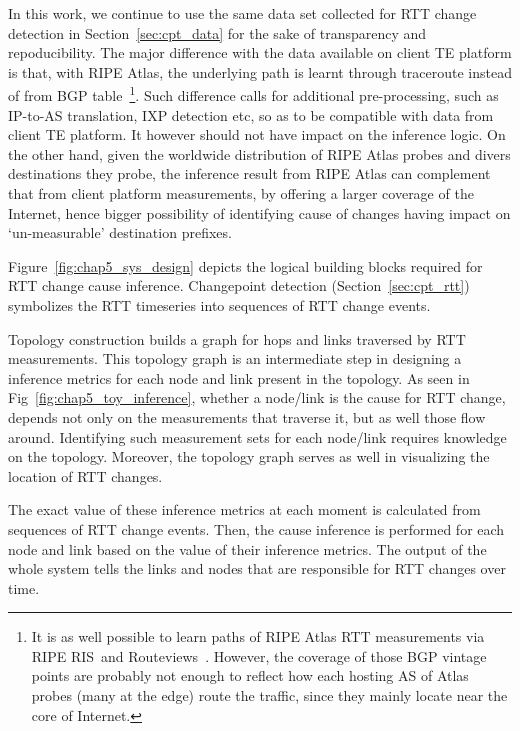 In this work, we continue to use the same data set collected for RTT change detection in Section~\ref{sec:cpt_data} for the sake of transparency and repoducibility. 
The major difference with the data available on client TE platform is that, with RIPE Atlas, the underlying path is learnt through traceroute instead of from BGP table~\footnote{It is as well possible to learn paths of RIPE Atlas RTT measurements via RIPE RIS~\cite{ris}and Routeviews~\cite{routeviews}. However, the coverage of those BGP vintage points are probably not enough to reflect how each hosting AS of Atlas probes (many at the edge) route the traffic, since they mainly locate near the core of Internet.}. 
Such difference calls for additional pre-processing, such as IP-to-AS translation, IXP detection etc, so as to be compatible with data from client TE platform. It however should not have impact on the inference logic. On the other hand, given the worldwide distribution of RIPE Atlas probes and divers destinations they probe, the inference result from RIPE Atlas can complement that from client platform measurements, by offering a larger coverage of the Internet, hence bigger possibility of identifying cause of changes having impact on `un-measurable' destination prefixes.

Figure~\ref{fig:chap5_sys_design} depicts the logical building blocks required for RTT change cause inference. Changepoint detection (Section~\ref{sec:cpt_rtt}) symbolizes the RTT timeseries into sequences of RTT change events.

Topology construction builds a graph for hops and links traversed by RTT measurements.
This topology graph is an intermediate step in designing a inference metrics for each node and link present in the topology. As seen in Fig~\ref{fig:chap5_toy_inference}, whether a node/link is the cause for RTT change, depends not only on the measurements that traverse it, but as well those flow around. Identifying such measurement sets for each node/link requires knowledge on the topology. Moreover, the topology graph serves as well in visualizing the location of RTT changes. 

The exact value of these inference metrics at each moment is calculated from sequences of RTT change events. Then, the cause inference is performed for each node and link based on the value of their inference metrics.
The output of the whole system tells the links and nodes that are responsible for RTT changes over time.

